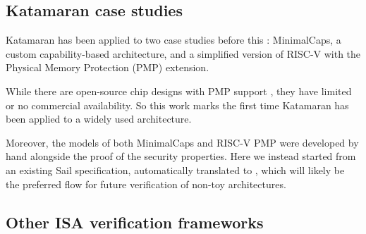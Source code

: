 \subsection{Katamaran case studies}

Katamaran has been applied to two case studies before this \cite{Huyghebaert2023}: MinimalCaps, a custom capability-based architecture, and a simplified version of RISC-V with the Physical Memory Protection (PMP) extension.

While there are open-source chip designs with PMP support \cite{ChipsAlliance}, they have limited or no commercial availability. So this work marks the first time Katamaran has been applied to a widely used architecture.

Moreover, the \usail models of both MinimalCaps and RISC-V PMP were developed by hand alongside the proof of the security properties. Here we instead started from an existing Sail specification, automatically translated to \usail, which will likely be the preferred flow for future verification of non-toy architectures.

\subsection{Other ISA verification frameworks}

